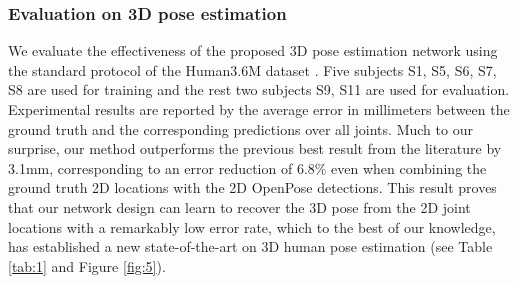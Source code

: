 \documentclass{bmvc2k}
\begin{document}
\subsubsection{Evaluation on 3D pose estimation}
We evaluate the effectiveness of the proposed 3D pose estimation network using the standard protocol of the Human3.6M dataset \cite{6682899,pavlakos2017coarse,martinez_2017_3dbaseline,VNect_SIGGRAPH2017}. Five subjects S1, S5, S6, S7, S8 are used for training and the rest two subjects S9, S11 are used for evaluation. Experimental results are reported by the average error in millimeters between the ground truth and the corresponding predictions over all joints. Much to our surprise, our method outperforms the previous best result from the literature \cite{martinez_2017_3dbaseline} by 3.1mm, corresponding to an error reduction of 6.8\% even when combining the ground truth 2D locations with the 2D OpenPose detections. This result proves that our network design can learn to recover the 3D pose from the 2D joint locations with a remarkably low error rate, which to the best of our knowledge, has established a new state-of-the-art on 3D human pose estimation (see Table \ref{tab:1} and Figure \ref{fig:5}). \\[-0.55cm]
\end{document}
